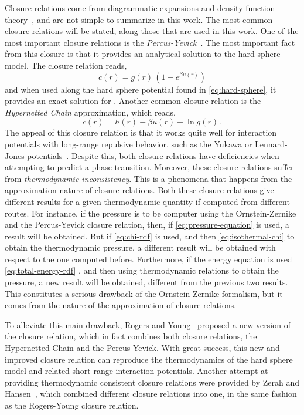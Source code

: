 Closure relations come from diagrammatic expansions and density function theory~\cite{hansenTheorySimpleLiquids2013},
and are not simple to summarize in this work. The most common closure relations will be
stated, along those that are used in this work. One of the most important closure relations
is the \emph{Percus-Yevick}~\cite{percusAnalysisClassicalStatistical1958}.
The most important fact from this closure is that it provides an analytical solution to the 
hard sphere model. The closure relation reads,
\begin{equation}
    c(r) = g(r) \, (1 - e^{\beta u(r)})
    \label{eq:py-cr}
\end{equation}
and when used along the hard sphere potential found in \autoref{eq:hard-sphere}, it provides
an exact solution for \rdf.
Another common closure relation is the \emph{Hypernetted Chain} approximation, which reads,
\begin{equation}
    c(r) = h(r) - \beta u(r) - \ln{g(r)} \, .
    \label{eq:hnc-cr}
\end{equation}
The appeal of this closure relation is that it works quite well for interaction potentials 
with long-range repulsive behavior, such as the Yukawa or Lennard-Jones potentials~\cite{hansenTheorySimpleLiquids2013}.
Despite this, both closure relations have deficiencies when attempting to predict a
phase transition. Moreover, these closure relations suffer from
\emph{thermodynamic inconsistency}. This is a phenomena that happens from the approximation
nature of closure relations. Both these closure relations give different results for
a given thermodynamic quantity if computed from different routes. For instance, if the 
pressure is to be computer using the Ornstein-Zernike and the Percus-Yevick closure 
relation, then, if \autoref{eq:pressure-equation} is used, a result will be obtained.
But if \autoref{eq:chi-rdf} is used, and then \autoref{eq:isothermal-chi} to obtain the 
thermodynamic pressure, a different result will be obtained with respect to the one
computed before. Furthermore, if the energy equation is used
\textemdash \autoref{eq:total-energy-rdf} \textemdash, 
and then using thermodynamic relations to obtain the pressure, a new result will be 
obtained, different from the previous two results. This constitutes a serious drawback of
the Ornstein-Zernike formalism, but it comes from the nature of the approximation of
closure relations.

To alleviate this main drawback, Rogers and Young~\cite{rogersNewThermodynamicallyConsistent1984b}
proposed a new version of the closure relation, which in fact combines both closure 
relations, the Hypernetted Chain and the Percus-Yevick. With great success, this new
and improved closure relation can reproduce the thermodynamics of the hard sphere model
and related short-range interaction potentials. Another attempt at providing thermodynamic
consistent closure relations were provided by Zerah and Hansen~\cite{zerahSelfConsistentIntegral1986},
which combined different closure relations into one, in the same fashion as the Rogers-Young
closure relation.


